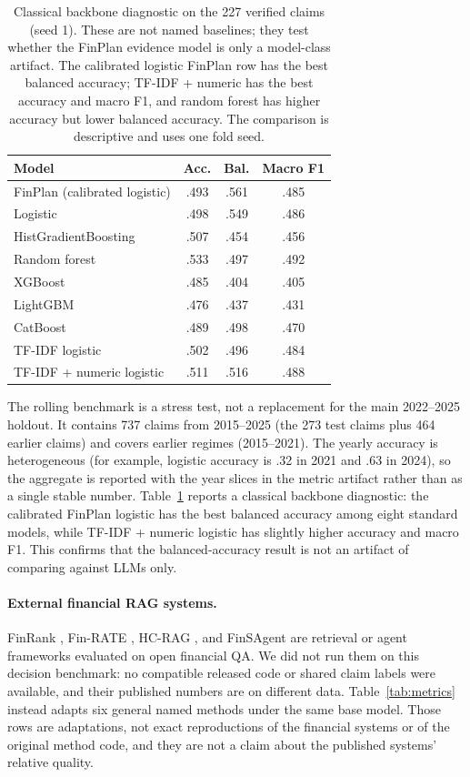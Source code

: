 \documentclass[11pt]{article}
\begin{document}
\begin{table}[t]
\centering
\footnotesize
\setlength{\tabcolsep}{3pt}
\begin{tabular}{lccc}
\toprule
Model & Acc. & Bal. & Macro F1 \\
\midrule
FinPlan (calibrated logistic) & .493 & .561 & .485 \\
Logistic & .498 & .549 & .486 \\
HistGradientBoosting & .507 & .454 & .456 \\
Random forest & .533 & .497 & .492 \\
XGBoost & .485 & .404 & .405 \\
LightGBM & .476 & .437 & .431 \\
CatBoost & .489 & .498 & .470 \\
TF-IDF logistic & .502 & .496 & .484 \\
TF-IDF + numeric logistic & .511 & .516 & .488 \\
\bottomrule
\end{tabular}
\caption{Classical backbone diagnostic on the 227 verified claims (seed 1). These are not named baselines; they test whether the FinPlan evidence model is only a model-class artifact. The calibrated logistic FinPlan row has the best balanced accuracy; TF-IDF + numeric has the best accuracy and macro F1, and random forest has higher accuracy but lower balanced accuracy. The comparison is descriptive and uses one fold seed.}
\label{tab:classical}
\end{table}

The rolling benchmark is a stress test, not a replacement for the main
2022--2025 holdout. It contains 737 claims from 2015--2025 (the 273 test claims
plus 464 earlier claims) and covers earlier regimes (2015--2021). The yearly
accuracy is heterogeneous (for example, logistic accuracy is .32 in 2021 and
.63 in 2024), so the aggregate is reported with the year slices in the metric
artifact rather than as a single stable number. Table~\ref{tab:classical}
reports a classical backbone diagnostic: the calibrated FinPlan logistic has
the best balanced accuracy among eight standard models, while TF-IDF + numeric
logistic has slightly higher accuracy and macro F1. This confirms that the
balanced-accuracy result is not an artifact of comparing against LLMs only.

\paragraph{External financial RAG systems.}
FinRank \citep{mansouri2026finrank}, Fin-RATE \citep{jiang2026finrate},
HC-RAG \citep{chen2026hcrag}, and FinSAgent \citep{chi2026finsagent} are
retrieval or agent frameworks evaluated on open financial QA. We did not run
them on this decision benchmark: no compatible released code or shared claim
labels were available, and their published numbers are on different data.
Table~\ref{tab:metrics} instead adapts six general named methods under the same
base model. Those rows are adaptations, not exact reproductions of the
financial systems or of the original method code, and they are not a claim
about the published systems' relative quality.
\end{document}
